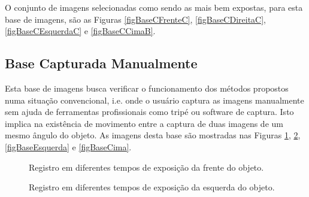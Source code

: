 O conjunto de imagens selecionadas como sendo as mais bem expostas, para esta base de imagens, são as Figuras \ref{figBaseCFrenteC}, \ref{figBaseCDireitaC}, \ref{figBaseCEsquerdaC} e  \ref{figBaseCCimaB}.

\subsection{Base Capturada Manualmente} \label{pontosBLivre}

Esta base de imagens busca verificar o funcionamento dos métodos propostos numa situação convencional, i.e. onde o usuário captura as imagens manualmente sem ajuda de ferramentas profissionais como tripé ou software de captura. Isto implica na existência de movimento entre a captura de duas imagens de um mesmo ângulo do objeto. As imagens desta base são mostradas nas Figuras \ref{figBaseFrente}, \ref{figBaseDireita}, \ref{figBaseEsquerda} e \ref{figBaseCima}. 

\begin{figure}[H]
  \centering 
  \quad %
  \quad %
  \quad %
  \caption{Registro em diferentes tempos de exposição da frente do objeto.}
  \label{figBaseFrente}
\end{figure}

\begin{figure}[H]
  \centering 
  \quad %
  \quad %
  \quad %
  \caption{Registro em diferentes tempos de exposição da esquerda do objeto.}
  \label{figBaseDireita}
\end{figure}

